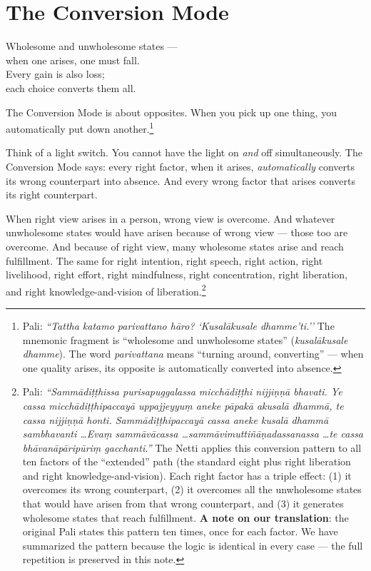 \ornament

\section*{The Conversion Mode}

\begin{versebox}
Wholesome and unwholesome states ---\\
when one arises, one must fall.\\
Every gain is also loss;\\
each choice converts them all.
\end{versebox}

\noindent The Conversion Mode is about opposites. When you pick up one thing, you automatically put down another.\footnote{Pali: \textit{``Tattha katamo parivattano hāro? `Kusalākusale dhamme'ti.''} The mnemonic fragment is ``wholesome and unwholesome states'' (\textit{kusalākusale dhamme}). The word \textit{parivattana} means ``turning around, converting'' --- when one quality arises, its opposite is automatically converted into absence.}

Think of a light switch. You cannot have the light on \textit{and} off simultaneously. The Conversion Mode says: every right factor, when it arises, \textit{automatically} converts its wrong counterpart into absence. And every wrong factor that arises converts its right counterpart.

When right view arises in a person, wrong view is overcome. And whatever unwholesome states would have arisen because of wrong view --- those too are overcome. And because of right view, many wholesome states arise and reach fulfillment. The same for right intention, right speech, right action, right livelihood, right effort, right mindfulness, right concentration, right liberation, and right knowledge-and-vision of liberation.\footnote{Pali: \textit{``Sammādiṭṭhissa purisapuggalassa micchādiṭṭhi nijjiṇṇā bhavati. Ye cassa micchādiṭṭhipaccayā uppajjeyyuṃ aneke pāpakā akusalā dhammā, te cassa nijjiṇṇā honti. Sammādiṭṭhipaccayā cassa aneke kusalā dhammā sambhavanti \ldots Evaṃ sammāvācassa \ldots sammāvimuttiñāṇadassanassa \ldots te cassa bhāvanāpāripūriṃ gacchanti.''} The Netti applies this conversion pattern to all ten factors of the ``extended'' path (the standard eight plus right liberation and right knowledge-and-vision). Each right factor has a triple effect: (1) it overcomes its wrong counterpart, (2) it overcomes all the unwholesome states that would have arisen from that wrong counterpart, and (3) it generates wholesome states that reach fulfillment. \textbf{A note on our translation}: the original Pali states this pattern ten times, once for each factor. We have summarized the pattern because the logic is identical in every case --- the full repetition is preserved in this note.}

